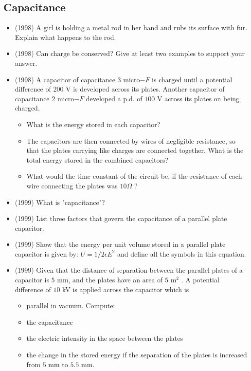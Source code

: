 \documentclass{article}
\begin{document}
\subsection{Capacitance}
\begin{itemize}
\item (1998)  A girl is holding a metal rod in her hand and rubs its surface with fur. Explain what happens to the rod.
\item (1998)  Can charge be conserved? Give at least two examples to support your answer.
\item (1998)  A capacitor of capacitance $ 3$ micro$ -F$ is charged until a potential difference of $ 200$ V is developed across its plates. Another capacitor of capacitance $ 2$ micro$ -F$ developed a p.d. of $ 100$ V across its plates on being charged.\begin{itemize}
\item What is the energy stored in each capacitor?
\item The capacitors are then connected by wires of negligible resistance, so that the plates carrying like charges are connected together. What is the total energy stored in the combined capacitors?
\item What would the time constant of the circuit be, if the resistance of each wire connecting the plates was $ 10\Omega $ ?
\end{itemize}
\item (1999)  What is "capacitance"?
\item (1999)  List three factors that govern the capacitance of a parallel plate capacitor.
\item (1999)  Show that the energy per unit volume stored in a parallel plate capacitor is given by: $ U=1/2\epsilon E^{2}$ and define all the symbols in this equation.
\item (1999)  Given that the distance of separation between the parallel plates of a capacitor is $ 5$ mm, and the plates have an area of $ 5$ m$ ^{2}$ . A potential difference of $ 10$ kV is applied across the capacitor which is\begin{itemize}
\item parallel in vacuum. Compute:
\item the capacitance
\item the electric intensity in the space between the plates
\item the change in the stored energy if the separation of the plates is increased from $ 5$ mm to $ 5.5$ mm.
\end{itemize}

\end{itemize}
\end{document}
